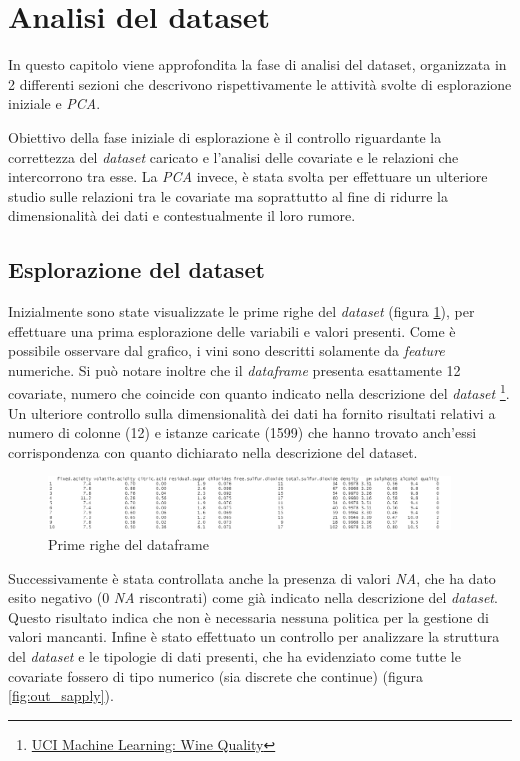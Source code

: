 \section{Analisi del dataset}
In questo capitolo viene approfondita la fase di analisi del dataset, organizzata in 2 differenti sezioni che descrivono rispettivamente le attività svolte di esplorazione iniziale e \textit{PCA}. 

Obiettivo della fase iniziale di esplorazione è il controllo riguardante la correttezza del \textit{dataset} caricato e l'analisi delle covariate e le relazioni che intercorrono tra esse. La \textit{PCA} invece, è stata svolta per effettuare un ulteriore studio sulle relazioni tra le covariate ma soprattutto al fine di ridurre la dimensionalità dei dati e contestualmente il loro rumore.

\subsection{Esplorazione del dataset} 
    Inizialmente sono state visualizzate le prime righe del \textit{dataset} (figura \ref{fig:out_head}), per effettuare una prima esplorazione delle variabili e valori presenti. Come è possibile osservare dal grafico, i vini sono descritti solamente da \textit{feature} numeriche. Si può notare inoltre che il \textit{dataframe} presenta esattamente 12 covariate, numero che coincide con quanto indicato nella descrizione del \textit{dataset} \footnote{\href{https://archive.ics.uci.edu/ml/datasets/wine+quality}{UCI Machine Learning: Wine Quality}}. 
    Un ulteriore controllo sulla dimensionalità dei dati ha fornito risultati relativi a numero di colonne (12) e istanze caricate (1599) che hanno trovato anch'essi corrispondenza con quanto dichiarato nella descrizione del dataset. 
    
    \imagespace
    \begin{figure}[h]
        \includegraphics[width=0.95\textwidth]{img/head(wine.data)}
        \centering
        \caption{Prime righe del dataframe}
        \label{fig:out_head}
    \end{figure}
    \imagespace
    
    Successivamente è stata controllata anche la presenza di valori \textit{NA}, che ha dato esito negativo (0 \textit{NA} riscontrati) come già indicato nella descrizione del \textit{dataset}. Questo risultato indica che non è necessaria nessuna politica per la gestione di valori mancanti.
    Infine è stato effettuato un controllo per analizzare la struttura del \textit{dataset} e le tipologie di dati presenti, che ha evidenziato come tutte le covariate fossero di tipo numerico (sia discrete che continue) (figura \ref{fig:out_sapply}). 
    
